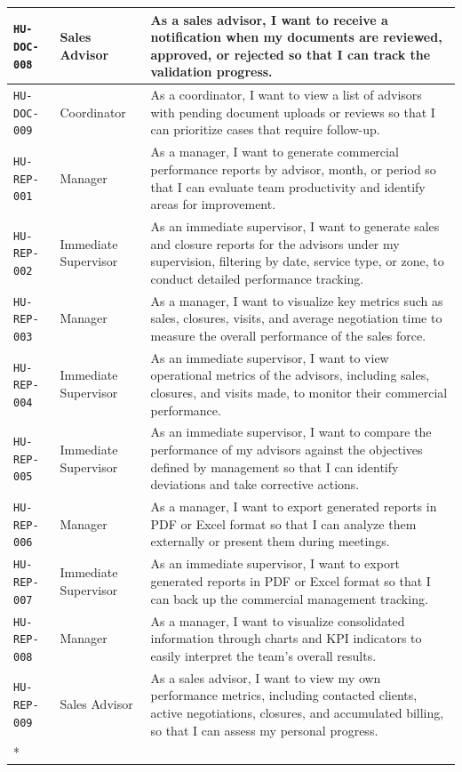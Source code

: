\documentclass[letterpaper%
, oneside%
, 12pt%
, memoireprojet%
, english%
,creativecommons,hyperref, withAlgo2e %
]{thETS}
\newcommand{\tablelastrow}{%
    \\* \hline
}
\begin{document}
\begin{longtable}{|L{2.5cm}|L{3.2cm}|L{7.9cm}|}
\hline
\texttt{HU-DOC-008} & Sales Advisor & As a sales advisor, I want to receive a notification when my documents are reviewed, approved, or rejected so that I can track the validation progress. \\
\hline
\texttt{HU-DOC-009} & Coordinator & As a coordinator, I want to view a list of advisors with pending document uploads or reviews so that I can prioritize cases that require follow-up. \\
\hline
\texttt{HU-REP-001} & Manager & As a manager, I want to generate commercial performance reports by advisor, month, or period so that I can evaluate team productivity and identify areas for improvement. \\
\hline
\texttt{HU-REP-002} & Immediate Supervisor & As an immediate supervisor, I want to generate sales and closure reports for the advisors under my supervision, filtering by date, service type, or zone, to conduct detailed performance tracking. \\
\hline
\texttt{HU-REP-003} & Manager & As a manager, I want to visualize key metrics such as sales, closures, visits, and average negotiation time to measure the overall performance of the sales force. \\
\hline
\texttt{HU-REP-004} & Immediate Supervisor & As an immediate supervisor, I want to view operational metrics of the advisors, including sales, closures, and visits made, to monitor their commercial performance. \\
\hline
\texttt{HU-REP-005} & Immediate Supervisor & As an immediate supervisor, I want to compare the performance of my advisors against the objectives defined by management so that I can identify deviations and take corrective actions. \\
\hline
\texttt{HU-REP-006} & Manager & As a manager, I want to export generated reports in PDF or Excel format so that I can analyze them externally or present them during meetings. \\
\hline
\texttt{HU-REP-007} & Immediate Supervisor & As an immediate supervisor, I want to export generated reports in PDF or Excel format so that I can back up the commercial management tracking. \\
\hline
\texttt{HU-REP-008} & Manager & As a manager, I want to visualize consolidated information through charts and KPI indicators to easily interpret the team’s overall results. \\
\hline
\texttt{HU-REP-009} & Sales Advisor & As a sales advisor, I want to view my own performance metrics, including contacted clients, active negotiations, closures, and accumulated billing, so that I can assess my personal progress. \tablelastrow
\end{longtable}
\endgroup
\end{document}
